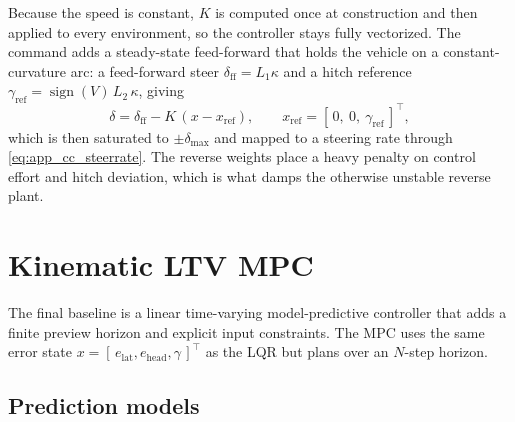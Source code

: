 Because the speed is constant, $K$ is computed once at construction and then applied to
every environment, so the controller stays fully vectorized. The command adds a
steady-state feed-forward that holds the vehicle on a constant-curvature arc: a
feed-forward steer $\delta_{\mathrm{ff}} = L_1 \kappa$ and a hitch reference
$\gamma_{\mathrm{ref}} = \operatorname{sign}(V)\, L_2\, \kappa$, giving
\begin{equation}
    \delta = \delta_{\mathrm{ff}} - K\,(x - x_{\mathrm{ref}}),
    \qquad
    x_{\mathrm{ref}} = [\,0,\ 0,\ \gamma_{\mathrm{ref}}\,]^\top,
    \label{eq:app_cc_lqr_cmd}
\end{equation}
which is then saturated to $\pm\delta_{\max}$ and mapped to a steering rate through
\cref{eq:app_cc_steerrate}. The reverse weights place a heavy penalty on control effort
and hitch deviation, which is what damps the otherwise unstable reverse plant.

\section{Kinematic LTV MPC}
\label{sec:app_cc_mpc}

The final baseline is a linear time-varying model-predictive controller
\cite{rawlings2017mpc} that adds a finite preview horizon and explicit input constraints.
The MPC uses the same error state $x = [\,e_{\mathrm{lat}}, e_{\mathrm{head}}, \gamma\,]^\top$
as the LQR but plans over an $N$-step horizon.

\subsection{Prediction models}

